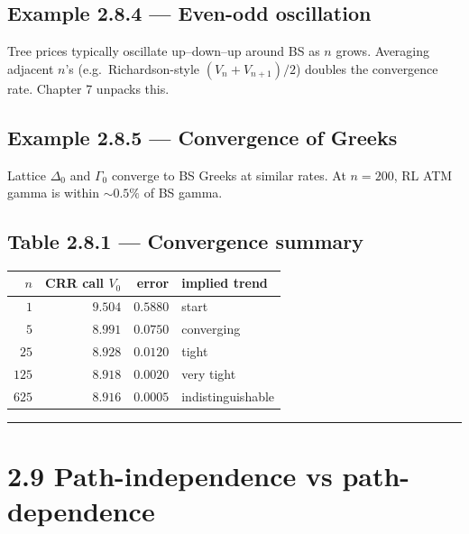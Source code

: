 \documentclass[
  10pt,
  twoside]{book}
\newcounter{none} %
\begin{document}
\subsection{Example 2.8.4 --- Even-odd
oscillation}\label{example-2.8.4-even-odd-oscillation}

Tree prices typically oscillate up--down--up around BS as \(n\) grows.
Averaging adjacent \(n\)'s (e.g.~Richardson-style \((V_n+V_{n+1})/2\))
doubles the convergence rate. Chapter 7 unpacks this.

\subsection{Example 2.8.5 --- Convergence of
Greeks}\label{example-2.8.5-convergence-of-greeks}

Lattice \(\Delta_0\) and \(\Gamma_0\) converge to BS Greeks at similar
rates. At \(n=200\), RL ATM gamma is within \(\sim 0.5\%\) of BS gamma.

\subsection{Table 2.8.1 --- Convergence
summary}\label{table-2.8.1-convergence-summary}

{\def\LTcaptype{none} %
\begin{table}[H]
\centering
\begin{tabular}{|r|r|r|l|}
\toprule
\(n\) & CRR call \(V_0\) & error & implied trend \\
\midrule



\(\phantom{00}1\) & \(9.504\) & \(0.5880\) & start \\
\(\phantom{00}5\) & \(8.991\) & \(0.0750\) & converging \\
\(\phantom{0}25\) & \(8.928\) & \(0.0120\) & tight \\
\(125\) & \(8.918\) & \(0.0020\) & very tight \\
\(625\) & \(8.916\) & \(0.0005\) & indistinguishable \\
\bottomrule
\end{tabular}
\end{table}
}

\begin{center}\rule{0.5\linewidth}{0.5pt}\end{center}

\section{2.9 Path-independence vs
path-dependence}\label{path-independence-vs-path-dependence}
\end{document}
